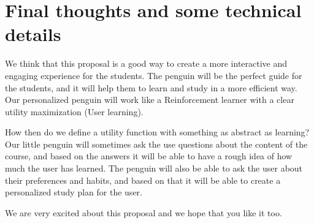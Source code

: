 \documentclass{report}
\begin{document}
\section{Final thoughts and some technical details}
We think that this proposal is a good way to create a more interactive and engaging experience for the students. The penguin will be the perfect guide for the students, and it will help them to learn and study in a more efficient way. Our personalized penguin will work like a Reinforcement learner with a clear utility maximization (User learning).

How then do we define a utility function with something as abstract as learning? Our little penguin will sometimes ask the use questions about the content of the course, and based on the answers it will be able to have a rough idea of how much the user has learned. The penguin will also be able to ask the user about their preferences and habits, and based on that it will be able to create a personalized study plan for the user.

We are very excited about this proposal and we hope that you like it too.
\end{document}
